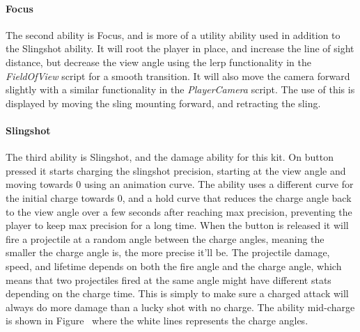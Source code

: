
\paragraph{Focus}
The second ability is Focus, and is more of a utility ability used in addition to the Slingshot ability. It will root the player in place, and increase the line of sight distance, but decrease the view angle using the lerp functionality in the \emph{FieldOfView} script for a smooth transition. It will also move the camera forward slightly with a similar functionality in the \emph{PlayerCamera} script. The use of this is displayed by moving the sling mounting forward, and retracting the sling.

\paragraph{Slingshot}
The third ability is Slingshot, and the damage ability for this kit. On button pressed it starts charging the slingshot precision, starting at the view angle and moving towards 0 using an animation curve. The ability uses a different curve for the initial charge towards 0, and a hold curve that reduces the charge angle back to the view angle over a few seconds after reaching max precision, preventing the player to keep max precision for a long time. When the button is released it will fire a projectile at a random angle between the charge angles, meaning the smaller the charge angle is, the more precise it'll be. The projectile damage, speed, and lifetime depends on both the fire angle and the charge angle, which means that two projectiles fired at the same angle might have different stats depending on the charge time. This is simply to make sure a charged attack will always do more damage than a lucky shot with no charge. The ability mid-charge is shown in Figure~ where the white lines represents the charge angles.

